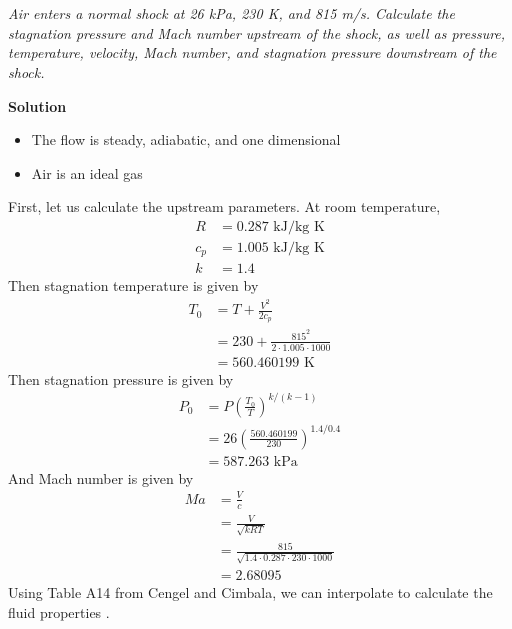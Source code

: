 \section{}

\textit{Air enters a normal shock at 26 kPa, 230 K, and 815 m/s. Calculate the stagnation pressure and Mach number upstream of the shock, as well as pressure, temperature, velocity, Mach number, and stagnation pressure downstream of the shock.}

\textbf{Solution}
\begin{itemize}
    \item The flow is steady, adiabatic, and one dimensional
    \item Air is an ideal gas 
\end{itemize}
First, let us calculate the upstream parameters. At room temperature, 
\begin{align*}
    R &= 0.287 \text{ kJ/kg K} \\
    c_p &= 1.005 \text{ kJ/kg K} \\
    k &= 1.4
\end{align*}
Then stagnation temperature is given by
\begin{align*}
    T_0 &= T + \frac{V^2}{2c_p} \\
    &= 230 + \frac{815^2}{2 \cdot 1.005 \cdot 1000} \\
    &= 560.460199 \text{ K}
\end{align*}
Then stagnation pressure is given by
\begin{align*}
    P_0 &= P \left( \frac{T_0}{T} \right)^{k/(k-1)} \\
    &= 26 \left( \frac{560.460199}{230} \right)^{1.4/0.4} \\
    &= \boxed{587.263 \text{ kPa}}
\end{align*}
And Mach number is given by
\begin{align*}
    Ma &= \frac{V}{c} \\
    &= \frac{V}{\sqrt{kR T}} \\
    &= \frac{815}{\sqrt{1.4 \cdot 0.287 \cdot 230 \cdot 1000}} \\
    &= \boxed{2.68095}
\end{align*}
Using Table A14 from Cengel and Cimbala, we can interpolate to calculate the fluid properties \cite{cengel_fluid_2018}.
